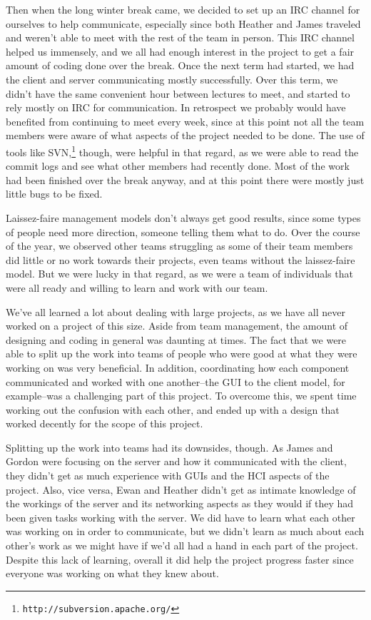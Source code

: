 Then when the long winter break came, we decided to set up an IRC channel for ourselves to help communicate, especially since both Heather and James traveled and weren't able to meet with the rest of the team in person. This IRC channel helped us immensely, and we all had enough interest in the project to get a fair amount of coding done over the break. Once the next term had started, we had the client and server communicating mostly successfully. Over this term, we didn't have the same convenient hour between lectures to meet, and started to rely mostly on IRC for communication. In retrospect we probably would have benefited from continuing to meet every week, since at this point not all the team members were aware of what aspects of the project needed to be done. The use of tools like SVN,\footnote{\texttt{http://subversion.apache.org/}} though, were helpful in that regard, as we were able to read the commit logs and see what other members had recently done. Most of the work had been finished over the break anyway, and at this point there were mostly just little bugs to be fixed.

Laissez-faire management models don't always get good results, since some types of people need more direction, someone telling them what to do. Over the course of the year, we observed other teams struggling as some of their team members did little or no work towards their projects, even teams without the laissez-faire model. But we were lucky in that regard, as we were a team of individuals that were all ready and willing to learn and work with our team.

We've all learned a lot about dealing with large projects, as we have all never worked on a project of this size. Aside from team management, the amount of designing and coding in general was daunting at times. The fact that we were able to split up the work into teams of people who were good at what they were working on was very beneficial. In addition, coordinating how each component communicated and worked with one another--the GUI to the client model, for example--was a challenging part of this project. To overcome this, we spent time working out the confusion with each other, and ended up with a design that worked decently for the scope of this project.

Splitting up the work into teams had its downsides, though. As James and Gordon were focusing on the server and how it communicated with the client, they didn't get as much experience with GUIs and the HCI aspects of the project. Also, vice versa, Ewan and Heather didn't get as intimate knowledge of the workings of the server and its networking aspects as they would if they had been given tasks working with the server. We did have to learn what each other was working on in order to communicate, but we didn't learn as much about each other's work as we might have if we'd all had a hand in each part of the project. Despite this lack of learning, overall it did help the project progress faster since everyone was working on what they knew about.

